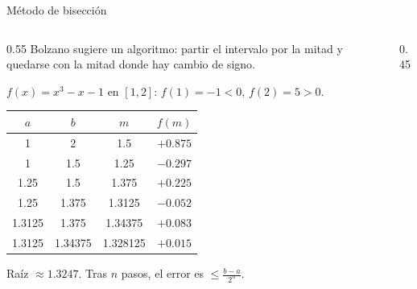 \documentclass[10pt,aspectratio=169]{beamer}
\begin{document}
\begin{frame}{Método de bisección}
  \begin{columns}
    \begin{column}{0.55\textwidth}
      Bolzano sugiere un algoritmo: partir el intervalo por la mitad y quedarse con la mitad donde hay cambio de signo.
      \begin{ejemplo}[1]
        $f(x)=x^3-x-1$ en $[1,2]$: $f(1)=-1<0$, $f(2)=5>0$.
        \begin{center}
          \small
          \begin{tabular}{c|c|c|c}
            $a$ & $b$ & $m$ & $f(m)$\\ \hline
            1 & 2 & 1.5 & $+0.875$\\
            1 & 1.5 & 1.25 & $-0.297$\\
            1.25 & 1.5 & 1.375 & $+0.225$\\
            1.25 & 1.375 & 1.3125 & $-0.052$\\
            1.3125 & 1.375 & 1.34375 & $+0.083$\\
            1.3125 & 1.34375 & 1.328125 & $+0.015$
          \end{tabular}
        \end{center}
        Raíz $\approx1.3247$. Tras $n$ pasos, el error es $\le\frac{b-a}{2^n}$.
      \end{ejemplo}
    \end{column}
    \begin{column}{0.45\textwidth}
      \centering
    \end{column}
  \end{columns}
\end{frame}
\end{document}
